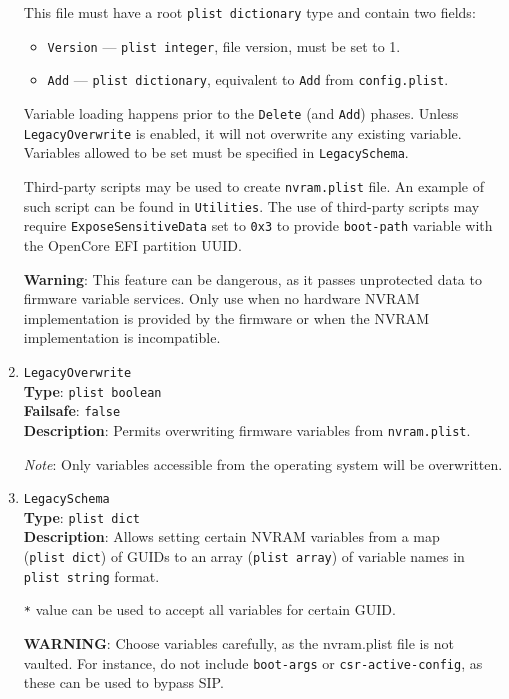\documentclass[]{article}
\providecommand{\tightlist}{%
  \setlength{\itemsep}{0pt}\setlength{\parskip}{0pt}}
\begin{document}
\begin{enumerate}
  This file must have a root \texttt{plist\ dictionary} type and contain two fields:
  \begin{itemize}
  \tightlist
  \item \texttt{Version} --- \texttt{plist\ integer}, file version, must be set to 1.
  \item \texttt{Add} --- \texttt{plist\ dictionary}, equivalent to \texttt{Add} from
  \texttt{config.plist}.
  \end{itemize}

  Variable loading happens prior to the \texttt{Delete} (and \texttt{Add}) phases. Unless
  \texttt{LegacyOverwrite} is enabled, it will not overwrite any existing variable.
  Variables allowed to be set must be specified in \texttt{LegacySchema}.

  Third-party scripts may be used to create \texttt{nvram.plist}
  file. An example of such script can be found in \texttt{Utilities}. The use of third-party
  scripts may require \texttt{ExposeSensitiveData} set to \texttt{0x3} to provide
  \texttt{boot-path} variable with the OpenCore EFI partition UUID.

  \textbf{Warning}: This feature can be dangerous, as it passes unprotected data to
  firmware variable services. Only use when no hardware NVRAM implementation is
  provided by the firmware or when the NVRAM implementation is incompatible.

\item
  \texttt{LegacyOverwrite}\\
  \textbf{Type}: \texttt{plist\ boolean}\\
  \textbf{Failsafe}: \texttt{false}\\
  \textbf{Description}: Permits overwriting firmware variables from \texttt{nvram.plist}.

  \emph{Note}: Only variables accessible from the operating system will be overwritten.

\item
  \texttt{LegacySchema}\\
  \textbf{Type}: \texttt{plist\ dict}\\
  \textbf{Description}: Allows setting certain NVRAM variables from a map
  (\texttt{plist\ dict}) of GUIDs to an array (\texttt{plist\ array}) of
  variable names in \texttt{plist\ string} format.

  \texttt{*} value can be used to accept all variables for certain GUID.

  \textbf{WARNING}: Choose variables carefully, as the nvram.plist file is not vaulted.
  For instance, do not include \texttt{boot-args} or \texttt{csr-active-config}, as
  these can be used to bypass SIP.


\end{enumerate}
\end{document}
